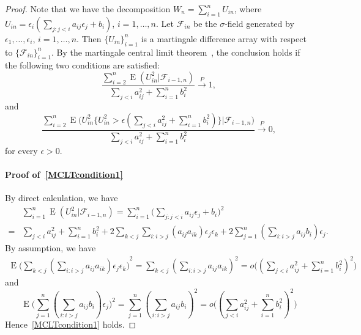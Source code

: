\documentclass[3p]{elsarticle}
\DeclareMathOperator{\myE}{E}
\theoremstyle{plain}
\theoremstyle{definition}
\theoremstyle{remark}
\begin{document}
 \begin{proof}
     Note that we have the decomposition $W_n=\sum_{i=1}^n U_{in}$, where $U_{in} =\epsilon_i (\sum_{j:j<i} a_{ij}\epsilon_j+b_i )$, $i=1,\ldots,n$.
    Let $\mathcal{F}_{in}$ be the $\sigma$-field generated by $\epsilon_1,\ldots,\epsilon_i$, $i=1,\ldots, n$.
     Then $\{U_{in}\}_{i=1}^n$ is a martingale difference array with respect to $\{\mathcal{F}_{in}\}_{i=1}^n$. 
     By the martingale central limit theorem~\citep[Theorem 1 of Chapter VIII ]{pollard1984convergence}, the conclusion holds if the following two conditions are satisfied:
     \begin{equation}\label{MCLTcondition1}
         \frac{\sum_{i=2}^n \myE(U_{in}^2 |\mathcal{F}_{i-1,n})}{\sum_{j<i} a_{ij}^2+\sum_{i=1}^n b_i^2}\xrightarrow{P} 1,
     \end{equation}
     and
     \begin{equation}\label{MCLTcondition2}
         \frac{\sum_{i=2}^n \myE\big(U_{in}^2\big\{U_{in}^2>\epsilon (\sum_{j<i} a_{ij}^2+\sum_{i=1}^n b_i^2)\big\}\big|\mathcal{F}_{i-1,n}\big)}{\sum_{ j<i} a_{ij}^2+\sum_{i=1}^n b_i^2}\xrightarrow{P} 0,
     \end{equation}
     for every $\epsilon>0$.

     \paragraph{Proof of~\eqref{MCLTcondition1}}
By direct calculation, we have
     \begin{equation*}
         \begin{aligned}
             &\sum_{i=1}^n \myE(U_{in}^2 |\mathcal{F}_{i-1,n})
             =\sum_{i=1}^n \big(\sum_{j:j<i}a_{ij}\epsilon_j +b_i \big)^2\\
             =&\sum_{j<i} a_{ij}^2+\sum_{i=1}^n b_i^2 +2\sum_{k<j} \sum_{i:i>j}(a_{ij}a_{ik})\epsilon_j \epsilon_k+2\sum_{j=1}^n (\sum_{i:i>j} a_{ij}b_i) \epsilon_j.
         \end{aligned}
     \end{equation*}
     By assumption, we have
     \begin{equation*}
         \begin{aligned}
             \myE{\big(\sum_{k<j} (\sum_{i:i>j}a_{ij}a_{ik})\epsilon_j \epsilon_k \big)}^2
             =
             \sum_{k<j} (\sum_{i:i>j}a_{ij}a_{ik})^2
             =
             o\big((\sum_{j<i} a_{ij}^2 +\sum_{i=1}^n b_i^2)^2\big)
         \end{aligned}
     \end{equation*}
     and
     $$
     \myE \big(\sum_{j=1}^n (\sum_{i:i>j} a_{ij}b_i) \epsilon_j\big)^2
     =
     \sum_{j=1}^n (\sum_{i:i>j} a_{ij}b_i)^2 
             =
             o\big((\sum_{j<i} a_{ij}^2 +\sum_{i=1}^n b_i^2)^2\big)
     $$
     Hence~\eqref{MCLTcondition1} holds.

\end{proof}
\end{document}
